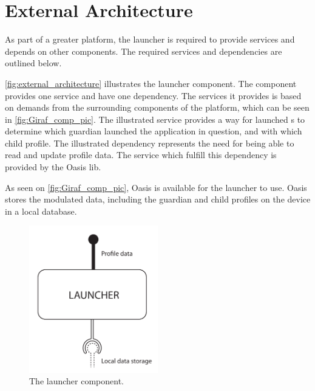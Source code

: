 \chapter{External Architecture}
\label{external_architecture}
As part of a greater platform, the launcher is required to provide services and depends on other components. The required services and dependencies are outlined below.

\autoref{fig:external_architecture} illustrates the \giraf[] launcher component. The component provides one service and have one dependency. The services it provides is based on demands from the surrounding components of the \giraf[] platform, which can be seen in \autoref{fig:Giraf_comp_pic}. The illustrated service provides a way for launched \girafapp[]s to determine which guardian launched the application in question, and with which child profile. The illustrated dependency represents the need for being able to read and update profile data. The service which fulfill this dependency is provided by the Oasis lib. 

As seen on \autoref{fig:Giraf_comp_pic}, Oasis is available for the launcher to use. Oasis stores the modulated data, including the guardian and child profiles on the device in a local database.


\begin{figure}[h]
	\centering
	\includegraphics[width=0.5\textwidth]{gfx/external_launcher_architecture.pdf}
	\caption{The \giraf[] launcher component.}
	\label{fig:external_architecture}
\end{figure}

